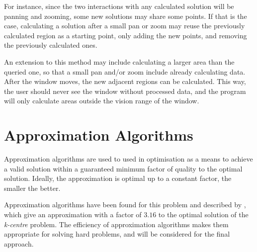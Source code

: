 For instance, since the two interactions with any calculated solution will be panning and zooming, some new solutions may share some points. If that is the case, calculating a solution after a small pan or zoom may reuse the previously calculated region as a starting point, only adding the new points, and removing the previously calculated ones.

An extension to this method may include calculating a larger area than the queried one, so that a small pan and/or zoom include already calculating data. After the window moves, the new adjacent regions can be calculated. This way, the user should never see the window without processed data, and the program will only calculate areas outside the vision range of the window.
\section {Approximation Algorithms}

Approximation algorithms are used to used in optimisation as a means to achieve a valid solution within a guaranteed minimum factor of quality to the optimal solution. Ideally, the approximation is optimal up to a constant factor, the smaller the better.

Approximation algorithms have been found for this problem and described by \citet{approx}, which give an approximation with a factor of $3.16$ to the optimal solution of the \emph{k-centre} problem. The efficiency of approximation algorithms makes them appropriate for solving hard problems, and will be considered for the final approach.

%
%
%
